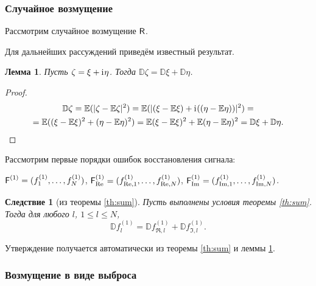 \documentclass[specialist,
               substylefile = spbu.rtx,
               subf,href,colorlinks=true, 12pt]{disser}
\newtheorem*{notice*}{Замечание}
\newtheorem{lemma}{Лемма}
\newtheorem{corollary}{Следствие}
\DeclareMathOperator{\rk}{rk}
\begin{document}


\subsubsection{Случайное возмущение}

Рассмотрим случайное возмущение $\textsf{R}$.

Для дальнейших рассуждений приведём известный результат.
\begin{lemma} \label{std:disp}
	Пусть $\zeta = \xi + \mathrm{i}\mkern1mu\eta$. Тогда $\mathbb{D}\zeta = \mathbb{D}\xi + \mathbb{D}\eta$.
\end{lemma}
\begin{proof}
\begin{multline*}
	\mathbb{D}\zeta = \mathbb{E}(|\zeta - \mathbb{E}\zeta|^2) = \mathbb{E}(|(\xi - \mathbb{E}\xi) + \mathrm{i}\mkern1mu((\eta - \mathbb{E}\eta))|^2) = \\
	= \mathbb{E}((\xi - \mathbb{E}\xi)^2 + (\eta - \mathbb{E}\eta)^2)= \mathbb{E}(\xi - \mathbb{E}\xi)^2 + \mathbb{E}(\eta - \mathbb{E}\eta)^2 = \mathbb{D}\xi + \mathbb{D}\eta.
\end{multline*}
\end{proof}

Рассмотрим первые порядки ошибок восстановления сигнала:

$\textsf{F}^{(1)} = (f^{(1)}_1, \ldots, f^{(1)}_N)$, $\textsf{F}^{(1)}_{\Re} = (f^{(1)}_{\Re,1}, \ldots, f^{(1)}_{\Re, N})$, $\textsf{F}^{(1)}_{\Im} = (f^{(1)}_{\Im,1}, \ldots, f^{(1)}_{\Im, N})$.


\begin{corollary}[из теоремы {\ref{th:sum}}] \label{st:dispsum}
	Пусть выполнены условия теоремы \ref{th:sum}.
	Тогда для любого $l$, $1\le l \le N$,
	\begin{equation} \label{eq:dispsum}
		\mathbb{D}f^{(1)}_l = \mathbb{D}f^{(1)}_{\Re, l} + \mathbb{D}f^{(1)}_{\Im, l}.	
	\end{equation}
\end{corollary}

Утверждение получается автоматически из теоремы \ref{th:sum} и леммы \ref{std:disp}.

\subsubsection{Возмущение в виде выброса} \label{ss:RMSEinv}
\end{document}
